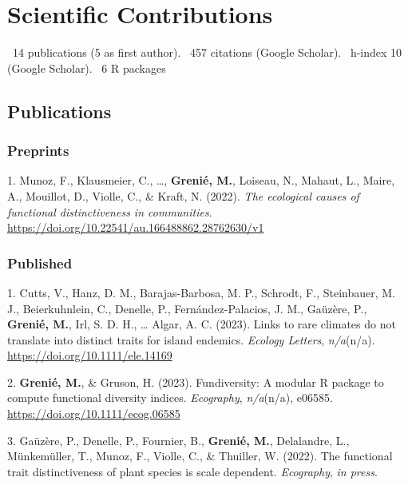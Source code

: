 \documentclass[10pt,a4paper,]{article}
\begin{document}
\hypertarget{scientific-contributions}{%
\section{Scientific Contributions}\label{scientific-contributions}}

\faFile*~14 publications (5 as first author). \faQuoteLeft~457 citations
(Google Scholar). \faHSquare~h-index 10 (Google Scholar). \faRProject~6
R packages

\hypertarget{publications}{%
\subsection{Publications}\label{publications}}

\hypertarget{preprints}{%
\subsubsection{Preprints}\label{preprints}}

\hypertarget{bibliography}{}
\leavevmode{}%
1. Munoz, F., Klausmeier, C., \ldots, \textbf{Grenié, M.}, Loiseau, N.,
Mahaut, L., Maire, A., Mouillot, D., Violle, C., \& Kraft, N. (2022).
\emph{The ecological causes of functional distinctiveness in
communities}. \url{https://doi.org/10.22541/au.166488862.28762630/v1}

\hypertarget{published}{%
\subsubsection{Published}\label{published}}

\hypertarget{bibliography}{}
\leavevmode{}%
1. Cutts, V., Hanz, D. M., Barajas-Barbosa, M. P., Schrodt, F.,
Steinbauer, M. J., Beierkuhnlein, C., Denelle, P., Fernández-Palacios,
J. M., Gaüzère, P., \textbf{Grenié, M.}, Irl, S. D. H., \ldots{} Algar,
A. C. (2023). Links to rare climates do not translate into distinct
traits for island endemics. \emph{Ecology Letters}, \emph{n/a}(n/a).
\url{https://doi.org/10.1111/ele.14169}

\leavevmode{}%
2. \textbf{Grenié, M.}, \& Gruson, H. (2023). Fundiversity: A modular R
package to compute functional diversity indices. \emph{Ecography},
\emph{n/a}(n/a), e06585. \url{https://doi.org/10.1111/ecog.06585}

\leavevmode{}%
3. Gaüzère, P., Denelle, P., Fournier, B., \textbf{Grenié, M.},
Delalandre, L., Münkemüller, T., Munoz, F., Violle, C., \& Thuiller, W.
(2022). The functional trait distinctiveness of plant species is scale
dependent. \emph{Ecography}, \emph{in press}.
\end{document}
